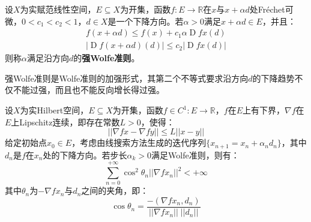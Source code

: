 \begin{definition}
	设$X$为实赋范线性空间，$E\subseteq X$为开集，函数$f:E\to\mathbb{R}$在$x$与$x+\alpha d$处Fr\'echet可微，$0<c_1<c_2<1$，$d\in X$是一个下降方向。若$\alpha>0$满足$x+\alpha d\in E$，并且：
	\begin{gather*}
		f(x+\alpha d)\leqslant f(x)+c_1\alpha\operatorname{D}fx(d) \\
		\left|\operatorname{D}f(x+\alpha d)(d)\right|\leqslant c_2\left|\operatorname{D}fx(d)\right|
	\end{gather*}
	则称$\alpha$满足沿方向$d$的\textbf{强Wolfe准则}。
\end{definition}
\begin{note}
	强Wolfe准则是Wolfe准则的加强形式，其第二个不等式要求沿方向$d$的下降趋势不仅不能过强，而且也不能反向增长得过强。
\end{note}
\begin{theorem}\label{theo:Zoutendijk}
	设$X$为实Hilbert空间，$E\subseteq X$为开集，函数$f\in C^1:E\to\mathbb{R}$，$f$在$E$上有下界，$\nabla f$在$E$上Lipschitz连续，即存在常数$L>0$，使得：
	\begin{equation*}
		||\nabla fx-\nabla fy||\leqslant L||x-y||
	\end{equation*}
	给定初始点$x_0\in E$，考虑由线搜索方法生成的迭代序列$\{x_{n+1}=x_n+\alpha_nd_n\}$，其中$d_n$是$f$在$x_n$处的下降方向。若步长$\alpha_k>0$满足Wolfe准则，则有：
	\begin{equation*}
		\sum_{n=0}^{+\infty}\cos^2\theta_n||\nabla fx_n||^2<+\infty
	\end{equation*}
	其中$\theta_n$为$-\nabla fx_n$与$d_n$之间的夹角，即：
	\begin{equation*}
		\cos\theta_n=\frac{-(\nabla fx_n,d_n)}{||\nabla fx_n||\;||d_n||}
	\end{equation*}
\end{theorem}
